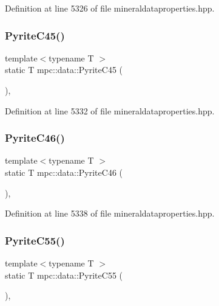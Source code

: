 Definition at line 5326 of file mineraldataproperties.\+hpp.

\mbox{\label{namespacempc_1_1data_a59b9ba769e4fecfeb985e7692370c559}} 
\subsubsection{\texorpdfstring{Pyrite\+C45()}{PyriteC45()}}
{\footnotesize\ttfamily template$<$typename T $>$ \\
static T mpc\+::data\+::\+Pyrite\+C45 (\begin{DoxyParamCaption}{ }\end{DoxyParamCaption})\hspace{0.3cm}{\ttfamily [inline]}, {\ttfamily [static]}}



Definition at line 5332 of file mineraldataproperties.\+hpp.

\mbox{\label{namespacempc_1_1data_a30e6a7eb13c51ce9b2ab13a766df352e}} 
\subsubsection{\texorpdfstring{Pyrite\+C46()}{PyriteC46()}}
{\footnotesize\ttfamily template$<$typename T $>$ \\
static T mpc\+::data\+::\+Pyrite\+C46 (\begin{DoxyParamCaption}{ }\end{DoxyParamCaption})\hspace{0.3cm}{\ttfamily [inline]}, {\ttfamily [static]}}



Definition at line 5338 of file mineraldataproperties.\+hpp.

\mbox{\label{namespacempc_1_1data_a4ca1154d37df73cd435286c05b0d9f0c}} 
\subsubsection{\texorpdfstring{Pyrite\+C55()}{PyriteC55()}}
{\footnotesize\ttfamily template$<$typename T $>$ \\
static T mpc\+::data\+::\+Pyrite\+C55 (\begin{DoxyParamCaption}{ }\end{DoxyParamCaption})\hspace{0.3cm}{\ttfamily [inline]}, {\ttfamily [static]}}



